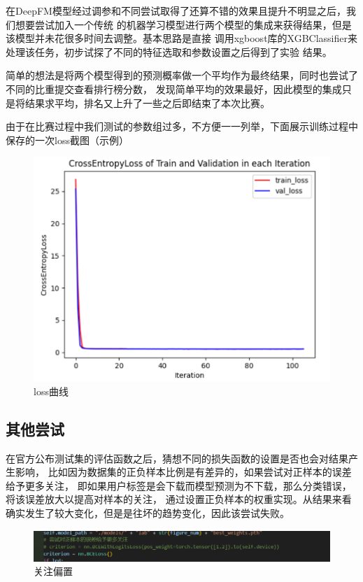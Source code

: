 \documentclass{article}
\begin{document}
在DeepFM模型经过调参和不同尝试取得了还算不错的效果且提升不明显之后，我们想要尝试加入一个传统
的机器学习模型进行两个模型的集成来获得结果，但是该模型并未花很多时间去调整。基本思路是直接
调用xgboost库的XGBClassifier来处理该任务，初步试探了不同的特征选取和参数设置之后得到了实验
结果。

简单的想法是将两个模型得到的预测概率做一个平均作为最终结果，同时也尝试了不同的比重提交查看排行榜分数，
发现简单平均的效果最好，因此模型的集成只是将结果求平均，排名又上升了一些之后即结束了本次比赛。

由于在比赛过程中我们测试的参数组过多，不方便一一列举，下面展示训练过程中保存的一次loss截图（示例）
\begin{figure}[htbp]
  \centering
  \includegraphics[scale=0.3]{loss.png}
  \caption{loss曲线}
  \label{figure11}
\end{figure}

\subsection{其他尝试}

在官方公布测试集的评估函数之后，猜想不同的损失函数的设置是否也会对结果产生影响，
比如因为数据集的正负样本比例是有差异的，如果尝试对正样本的误差给予更多关注，
即如果用户标签是会下载而模型预测为不下载，那么分类错误，将该误差放大以提高对样本的关注，
通过设置正负样本的权重实现。从结果来看确实发生了较大变化，但是是往坏的趋势变化，因此该尝试失败。

\begin{figure}[htbp]
  \centering
  \includegraphics[scale=0.3]{try1.png}
  \caption{关注偏置}
  \label{figure10}
\end{figure}
\clearpage
\end{document}
